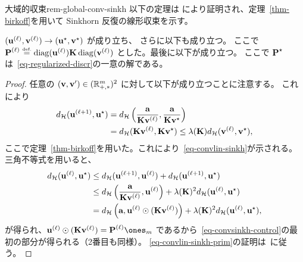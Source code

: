 \begin{rem11}{大域的収束}{rem-global-conv-sinkh}
以下の定理は \citep{franklin1989scaling} により証明され、定理~\ref{thm-birkoff}を用いて Sinkhorn 反復の線形収束を示す。

\begin{thm}
	$(\it{\uD},\it{\vD}) \rightarrow (\uD^\star,\vD^\star)$ が成り立ち、
	さらに以下も成り立つ。
	ここで $\it{\P} \eqdef \diag(\it{\uD}) \K \diag(\it{\vD})$ とした。最後に以下が成り立つ。
	\eql{\label{eq-convlin-sinkh-prim}
		\|\log(\it{\P}) - \log(\P^\star)\|_\infty \leq \Hilbert(\it{\uD}, \uD^\star) + \Hilbert(\it{\vD}, \vD^\star),
	}
	ここで $\P^\star$ は~\eqref{eq-regularized-discr}の一意の解である。
\end{thm}

\begin{proof}
	任意の $(\vD,\vD') \in (\RR_{+,*}^m)^2$ に対して以下が成り立つことに注意する。
	これにより
	\begin{align*}
		\Hilbert(\itt{\uD},\uD^\star) &= \Hilbert\pa{ \frac{\a}{\K \it{\vD}}, \frac{\a}{\K \vD^\star} } \\
		&= \Hilbert( \K \it{\vD}, \K \vD^\star ) \leq \la(\K) \Hilbert( \it{\vD}, \vD^\star ),
	\end{align*}
	ここで定理~\ref{thm-birkoff}を用いた。これにより~\eqref{eq-convlin-sinkh}が示される。三角不等式を用いると、
	\begin{align*}
		\Hilbert(\it{\uD},\uD^\star) &\leq \Hilbert(\itt{\uD},\it{\uD}) + \Hilbert(\itt{\uD},\uD^\star) \\
		&\leq \Hilbert\pa{ \frac{\a}{\K \it{\vD}},\it{\uD} } + \la(\K)^2 \Hilbert(\it{\uD},\uD^\star) \\
		&= \Hilbert\pa{ \a,\it{\uD} \odot  ( \K \it{\vD} ) } + \la(\K)^2 \Hilbert(\it{\uD},\uD^\star),
	\end{align*}
	が得られ、$\it{\uD} \odot  ( \K \it{\vD} ) = \it{\P}\ones_m$ であるから~\eqref{eq-convsinkh-control}の最初の部分が得られる（2番目も同様）。
	\eqref{eq-convlin-sinkh-prim}の証明は~\citep[Lem. 3]{franklin1989scaling}に従う。
\end{proof}


\end{rem11}
